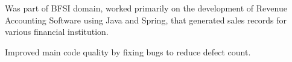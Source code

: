 \documentclass[]{kushal-resume}
\begin{document}
\begin{minipage}[t]{0.66\textwidth}
\begin{tightemize}
\item Was part of BFSI domain, worked primarily on the development of Revenue Accounting Software using Java and Spring, that generated
 sales records for various financial institution. 
 \item Improved main code quality by fixing bugs to reduce defect count.
\end{tightemize}
\sectionsep


\end{minipage} 
\end{document}

